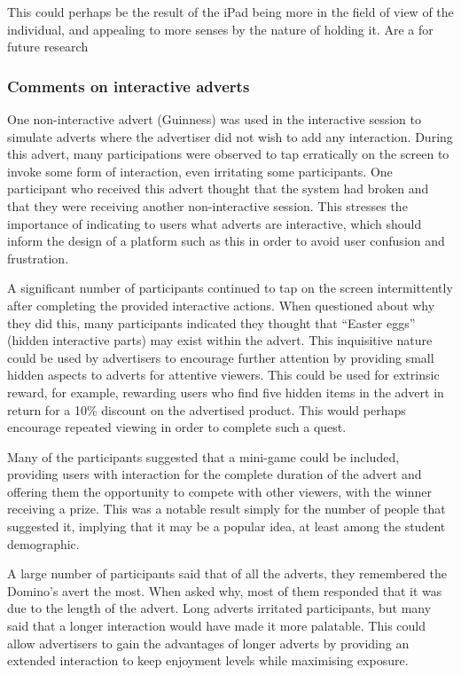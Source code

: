 	This could perhaps be the result of the iPad being more in the field of view of the individual, and appealing to more senses by the nature of holding it. Are a for future research
	

	\subsubsection{Comments on interactive adverts}

	One non-interactive advert (Guinness) was used in the interactive session to simulate adverts where the advertiser did not wish to add any interaction. During this advert, many participations were observed to tap erratically on the screen to invoke some form of interaction, even irritating some participants. One participant who received this advert thought that the system had broken and that they were receiving another non-interactive session. This stresses the importance of indicating to users what adverts are interactive, which should inform the design of a platform such as this in order to avoid user confusion and frustration.

	A significant number of participants continued to tap on the screen intermittently after completing the provided interactive actions. When questioned about why they did this, many participants indicated they thought that ``Easter eggs'' (hidden interactive parts) may exist within the advert. This inquisitive nature could be used by advertisers to encourage further attention by providing small hidden aspects to adverts for attentive viewers. This could be used for extrinsic reward, for example, rewarding users who find five hidden items in the advert in return for a 10\% discount on the advertised product. This would perhaps encourage repeated viewing in order to complete such a quest.

	Many of the participants suggested that a mini-game could be included, providing users with interaction for the complete duration of the advert and offering them the opportunity to compete with other viewers, with the winner receiving a prize. This was a notable result simply for the number of people that suggested it, implying that it may be a popular idea, at least among the student demographic.

	A large number of participants said that of all the adverts, they remembered the Domino's avert the most. When asked why, most of them responded that it was due to the length of the advert. Long adverts irritated participants, but many said that a longer interaction would have made it more palatable. This could allow advertisers to gain the advantages of longer adverts by providing an extended interaction to keep enjoyment levels while maximising exposure.